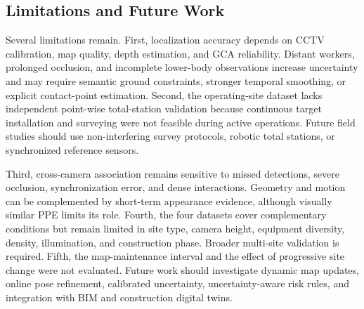 \subsection{Limitations and Future Work}
Several limitations remain. First, localization accuracy depends on CCTV calibration, map quality, depth estimation, and GCA reliability. Distant workers, prolonged occlusion, and incomplete lower-body observations increase uncertainty and may require semantic ground constraints, stronger temporal smoothing, or explicit contact-point estimation. Second, the operating-site dataset lacks independent point-wise total-station validation because continuous target installation and surveying were not feasible during active operations. Future field studies should use non-interfering survey protocols, robotic total stations, or synchronized reference sensors.

Third, cross-camera association remains sensitive to missed detections, severe occlusion, synchronization error, and dense interactions. Geometry and motion can be complemented by short-term appearance evidence, although visually similar PPE limits its role. Fourth, the four datasets cover complementary conditions but remain limited in site type, camera height, equipment diversity, density, illumination, and construction phase. Broader multi-site validation is required. Fifth, the map-maintenance interval and the effect of progressive site change were not evaluated. Future work should investigate dynamic map updates, online pose refinement, calibrated uncertainty, uncertainty-aware risk rules, and integration with BIM and construction digital twins.
